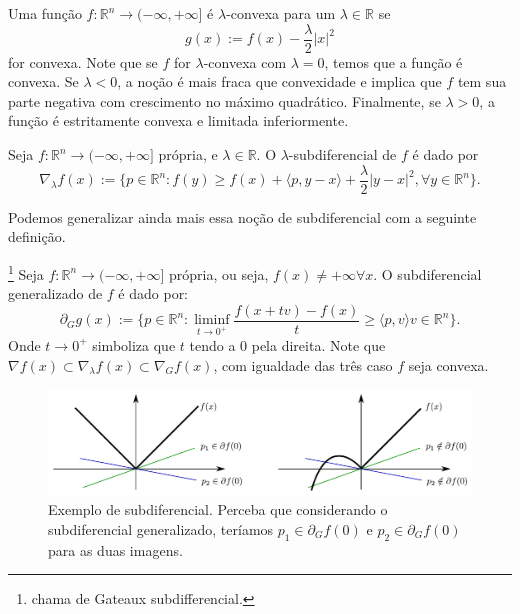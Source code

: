\begin{definition}
    Uma função $f:\mathbb R^n \to (-\infty,+\infty]$ é $\lambda$-convexa
    para um $\lambda\in\mathbb R$ se
    \begin{equation}
        g(x):=f(x) -\frac{\lambda}{2}|x|^2
    \end{equation}
    for convexa.
    Note que se $f$ for $\lambda$-convexa com $\lambda =0$, temos que a função é convexa.
    Se $\lambda <0$, a noção é mais fraca que convexidade e implica que
    $f$ tem sua parte negativa com crescimento no máximo quadrático.
    Finalmente, se $\lambda > 0$, a função é estritamente convexa e
    limitada inferiormente.
\end{definition}

\begin{definition}
    Seja $f:\mathbb R^n \to (-\infty, +\infty]$ própria, e $\lambda \in \mathbb R$.
    O $\lambda$-subdiferencial de $f$ é dado por
    \begin{equation}
        \nabla_\lambda f(x) := \{
            p \in \mathbb R^n: f(y) \geq f(x) + \langle p, y-x\rangle
            + \frac{\lambda}{2}|y-x|^2, \forall y \in \mathbb R^n\}.
    \end{equation}
\end{definition}

Podemos generalizar ainda mais essa noção de subdiferencial com a seguinte definição.
\begin{definition}
    \footnote{\citet{ambrosio2021lectures} chama de Gateaux subdifferencial.}
    Seja $f:\mathbb R^n \to (-\infty, +\infty]$ própria, ou seja, $f(x) \neq +\infty \forall x$.
    O subdiferencial generalizado de $f$ é dado por:
    \begin{equation}
        \partial_G g(x):= \{p \in \mathbb R^n: \liminf_{t\to 0^+}\frac{f(x+tv) - f(x)}{t}
        \geq \langle p,v \rangle v \in \mathbb R^n\}.
    \end{equation}
    Onde $t \to 0^+$ simboliza que $t$ tendo a $0$ pela direita.
    Note que $\nabla f(x)\subset \nabla_\lambda f(x) \subset \nabla_G f(x)$, com igualdade
    das três caso $f$ seja convexa.
\end{definition}

\begin{figure}[H]
    \includegraphics[width=1\textwidth]{./Figures/subdiferencial}
    \caption{Exemplo de subdiferencial. Perceba que considerando
    o subdiferencial generalizado, teríamos
    $p_1 \in \partial_G f(0)$ e $p_2 \in \partial_G f(0)$ para as duas imagens.}
    \label{fig:subdiferencial}
\end{figure}

